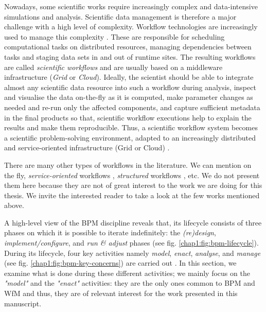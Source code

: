 Nowadays, some scientific works require increasingly complex and data-intensive simulations and analysis. Scientific data management is therefore a major challenge \cite{bell2009beyond} with a high level of complexity. Workflow technologies are increasingly used to manage this complexity \cite{juveGideon}. These are responsible for scheduling computational tasks on distributed resources, managing dependencies between tasks and staging data sets in and out of runtime sites. The resulting workflows are called \textit{scientific workflows} and are usually based on a middleware infrastructure (\textit{Grid} or \textit{Cloud}). Ideally, the scientist should be able to integrate almost any scientific data resource into such a workflow during analysis, inspect and visualise the data on-the-fly as it is computed, make parameter changes as needed and re-run only the affected components, and capture sufficient metadata in the final products so that, scientific workflow executions help to explain the results and make them reproducible. Thus, a scientific workflow system becomes a scientific problem-solving environment, adapted to an increasingly distributed and service-oriented infrastructure (Grid or Cloud) \cite{ludascher2006scientific}.

There are many other types of workflows in the literature. We can mention on the fly, \textit{service-oriented} workflows \cite{piccinelli2003service, yongyi2009research}, \textit{structured} workflows \cite{kiepuszewski2000structured, eder2002meta, liu2005analysis}, etc. We do not present them here because they are not of great interest to the work we are doing for this thesis. We invite the interested reader to take a look at the few works mentioned above.


\label{chap1:sec:bpm-key-activities-concerns}
A high-level view of the BPM discipline reveals that, its lifecycle consists of three phases on which it is possible to iterate indefinitely: the \textit{(re)design}, \textit{implement/configure}, and \textit{run \& adjust} phases \cite{van2013business} (see fig. \ref{chap1:fig:bpm-lifecycle}). 
During its lifecycle, four key activities namely \textit{model}, \textit{enact}, \textit{analyse}, and \textit{manage} (see fig. \ref{chap1:fig:bpm-key-concerns}) are carried out \cite{van2013business}. 
In this section, we examine what is done during these different activities; we mainly focus on the \textit{"model"} and the \textit{"enact"} activities: they are the only ones common to BPM and WfM and thus, they are of relevant interest for the work presented in this manuscript. 

